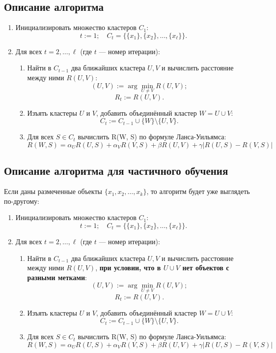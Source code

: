 \subsection{Описание алгоритма}
\begin{enumerate}
    \item Инициализировать множество кластеров $C_1$:  
    \[
    t := 1; \quad C_t = \{\{x_1\}, \{x_2\}, \ldots, \{x_\ell\}\}.
    \]
    \item Для всех $t = 2, \ldots, \ell$ (где $t$ — номер итерации):
    \begin{enumerate}
        \item Найти в $C_{t-1}$ два ближайших кластера $U, V$ и вычислить расстояние между ними $R(U, V)$:
        \[
        (U, V) := \arg \min_{U \neq V} R(U, V);
        \]
        \[
        R_t := R(U, V).
        \]
        \item Изъять кластеры $U$ и $V$, добавить объединённый кластер $W = U \cup V$:
        \[
        C_t := C_{t-1} \cup \{W\} \setminus \{U, V\}.
        \]
        \item Для всех $S \in C_t$ вычислить R(W, S) по формуле Ланса-Уильямса:
        \[
R(W, S) = \alpha_U R(U, S) + \alpha_V R(V, S) + \beta R(U, V) + \gamma |R(U, S) - R(V, S)|
        \]
    \end{enumerate}
\end{enumerate}

\subsection{Описание алгоритма для частичного обучения}
Если даны размеченные объекты $\{x_1, x_2, \ldots, x_k\}$, то алгоритм будет уже выглядеть по-другому:
\begin{enumerate}
    \item Инициализировать множество кластеров $C_1$:  
    \[
    t := 1; \quad C_t = \{\{x_1\}, \{x_2\}, \ldots, \{x_\ell\}\}.
    \]
    \item Для всех $t = 2, \ldots, \ell$ (где $t$ — номер итерации):
    \begin{enumerate}
        \item Найти в $C_{t-1}$ два ближайших кластера $U, V$ и вычислить расстояние между ними $R(U, V)$, \textbf{при условии, что в $U \cup V$ нет объектов с разными метками}:
        \[
        (U, V) := \arg \min_{U \neq V} R(U, V);
        \]
        \[
        R_t := R(U, V).
        \]
        \item Изъять кластеры $U$ и $V$, добавить объединённый кластер $W = U \cup V$:
        \[
        C_t := C_{t-1} \cup \{W\} \setminus \{U, V\}.
        \]
        \item Для всех $S \in C_t$ вычислить R(W, S) по формуле Ланса-Уильямса:
        \[
R(W, S) = \alpha_U R(U, S) + \alpha_V R(V, S) + \beta R(U, V) + \gamma |R(U, S) - R(V, S)|
        \]
    \end{enumerate}
\end{enumerate}

